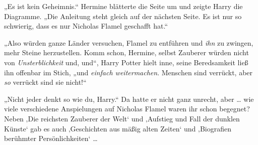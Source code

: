 „Es ist kein Geheimnis.“ Hermine blätterte die Seite um und zeigte Harry die Diagramme.
„Die Anleitung steht gleich auf der nächsten Seite. Es ist nur so schwierig, dass es nur Nicholas Flamel geschafft hat.“

„Also würden ganze Länder versuchen, Flamel zu entführen und \emph{ihn} zu zwingen, mehr Steine herzustellen. Komm schon, Hermine, selbst Zauberer würden nicht von \emph{Unsterblichkeit} und, und“, Harry Potter hielt inne, seine Beredsamkeit ließ ihn offenbar im Stich, „und \emph{einfach weitermachen}. Menschen sind verrückt, aber \emph{so} verrückt sind sie nicht!“

„Nicht jeder denkt so wie du, Harry.“ Da hatte er nicht ganz unrecht, aber … wie viele verschiedene Anspielungen auf Nicholas Flamel waren ihr schon begegnet? Neben ‚Die reichsten Zauberer der Welt‘ und ‚Aufstieg und Fall der dunklen Künste‘ gab es auch
‚Geschichten aus mäßig alten Zeiten‘ und ‚Biografien berühmter Persönlichkeiten‘ …

